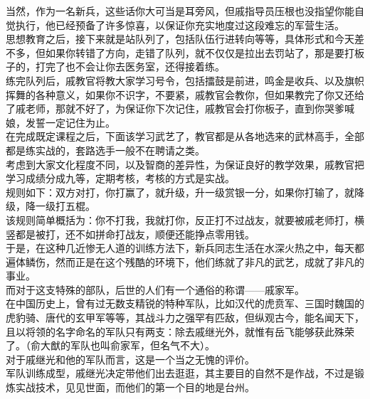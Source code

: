 \begin{multicols}{\theparacolNo}
当然，作为一名新兵，这些话你大可当是耳旁风，但戚指导员压根也没指望你能自觉执行，他已经预备了许多惊喜，以保证你充实地度过这段难忘的军营生活。\\

思想教育之后，接下来就是站队列了，包括队伍行进转向等等，具体形式和今天差不多，但如果你转错了方向，走错了队列，就不仅仅是拉出去罚站了，那是要打板子的，打完了也不会让你去医务室，还得接着练。\\

练完队列后，戚教官将教大家学习号令，包括擂鼓是前进，鸣金是收兵、以及旗帜挥舞的各种意义，如果你不识字，不要紧，戚教官会教你，但如果教完了你又还给了戚老师，那就不好了，为保证你下次记住，戚教官会打你板子，直到你哭爹喊娘，发誓一定记住为止。\\

在完成既定课程之后，下面该学习武艺了，教官都是从各地选来的武林高手，全部都是练实战的，套路选手一般不在聘请之类。\\

考虑到大家文化程度不同，以及智商的差异性，为保证良好的教学效果，戚教官把学习成绩分成九等，定期考核，考核的方式是实战。\\

规则如下：双方对打，你打赢了，就升级，升一级赏银一分，如果你打输了，就降级，降一级打五棍。\\

该规则简单概括为：你不打我，我就打你，反正打不过战友，就要被戚老师打，横竖都是被打，还不如拼命打战友，顺便还能挣点零用钱。\\

于是，在这种几近惨无人道的训练方法下，新兵同志生活在水深火热之中，每天都遍体鳞伤，然而正是在这个残酷的环境下，他们练就了非凡的武艺，成就了非凡的事业。\\

而对于这支特殊的部队，后世的人们有一个通俗的称谓——戚家军。\\

在中国历史上，曾有过无数支精锐的特种军队，比如汉代的虎贲军、三国时魏国的虎豹骑、唐代的玄甲军等等，其战斗力之强罕有匹敌，但纵观古今，能名闻天下，且以将领的名字命名的军队只有两支：除去戚继光外，就惟有岳飞能够获此殊荣了。（俞大猷的军队也叫俞家军，但名气不大）。\\

对于戚继光和他的军队而言，这是一个当之无愧的评价。\\

军队训练成型，戚继光决定带他们出去逛逛，其主要目的自然不是作战，不过是锻炼实战技术，见见世面，而他们的第一个目的地是台州。\\


\end{multicols}
